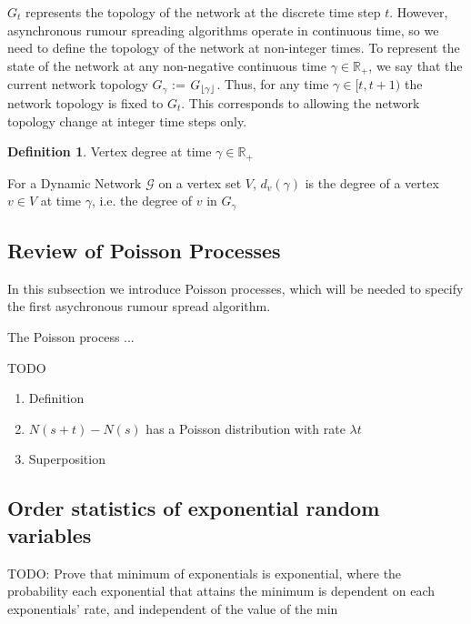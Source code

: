 \documentclass[a4paper,11pt]{article}
\theoremstyle{definition}
\newtheorem{definition}[theorem]{Definition}
\DeclarePairedDelimiter\floor{\lfloor}{\rfloor}
\begin{document}
$G_t$ represents the topology of the network at the discrete time step $t$. However, asynchronous rumour spreading algorithms operate in continuous time, so we need to define the topology of the network at non-integer times. To represent the state of the network at any non-negative continuous time $\gamma \in \mathbb{R}_+$, we say that the current network topology $G_\gamma$ := $G_{\floor\gamma}$. Thus, for any time $\gamma \in [t, t + 1)$ the network topology is fixed to $G_t$. This corresponds to allowing the network topology change at integer time steps only.


\begin{definition}
	Vertex degree at time $\gamma \in \mathbb{R}_+ $ 

	\noindent
	For a Dynamic Network $\mathcal{G}$ on a vertex set $V$, $d_v(\gamma)$ is the degree of a vertex $v \in V$ at time $\gamma$, i.e. the degree of $v$ in $G_\gamma$
\end{definition}


\subsection{Review of Poisson Processes}

In this subsection we introduce Poisson processes, which will be needed to specify the first asychronous rumour spread algorithm.

The Poisson process ...

TODO

\begin{enumerate}
	\item Definition
	\item $N(s + t) - N(s)$ has a Poisson distribution with rate $\lambda t$
	\item Superposition
\end{enumerate}


\subsection{Order statistics of exponential random variables}

TODO: Prove that minimum of exponentials is exponential, where the probability each exponential that attains the minimum is dependent on each exponentials' rate, and independent of the value of the min

\end{document}
